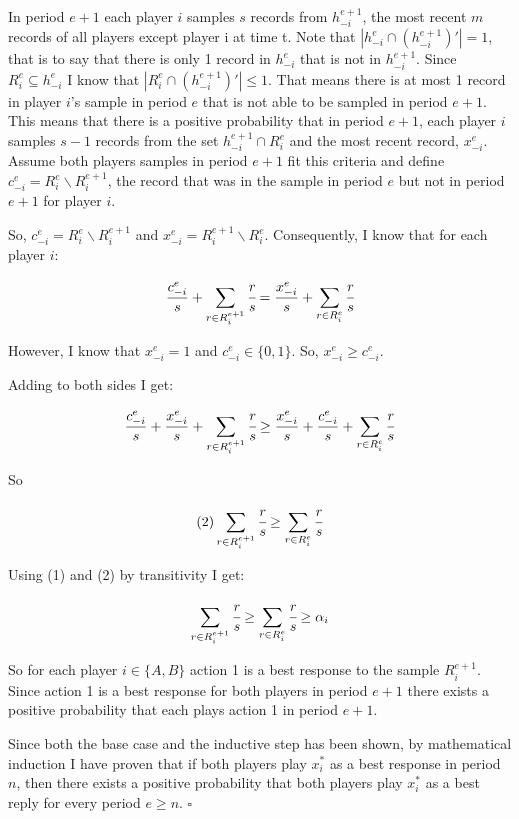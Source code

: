\documentclass[12pt]{article}
\begin{document}
\vskip6pt

In period $e+1$ each player $i$ samples $s$ records from $h_{-i}^{e+1}$, the most recent $m$
records of all players except player i at time t. Note that $|h_{-i}^{e} \cap (h_{-i}^{e+1})'|=1$, that is to say that there is only 1 record in $h_{-i}^{e}$ that is not in $h_{-i}^{e+1}$. Since $R_i^{e} \subseteq h_{-i}^{e}$ I know that $|R_i^{e} \cap (h_{-i}^{e+1})'| \leq 1$. That means there is at most 1 record in player $i$'s sample in period $e$ that is not able to be sampled in period $e+1$. This means that there is a positive probability that in period $e+1$, each player $i$ samples $s-1$ records from the set $h_{-i}^{e+1} \cap R_i^{e}$ and the most recent record, $x_{-i}^{e}$. Assume both players samples in period $e+1$ fit this criteria and define $c_{-i}^{e}=R_i^e \backslash R_i^{e+1}$, the record that was in the sample in period $e$ but not in period $e+1$ for player $i$.

\vskip6pt

So, $c_{-i}^{e}=R_i^e \backslash R_i^{e+1}$ and $x_{-i}^{e}=R_i^{e+1} \backslash R_i^{e}$. Consequently, I know that for each player $i$:

$$\frac{c_{-i}^{e}}{s} + \sum\limits_{r \in R_i^{e+1}} \cfrac{r}{s} = \frac{x_{-i}^{e}}{s} + \sum\limits_{r \in R_i^{e}} \cfrac{r}{s}$$

However, I know that $x_{-i}^{e}=1$ and $c_{-i}^{e} \in \{0,1\}$. So, $x_{-i}^{e} \geq c_{-i}^{e}$.

Adding to both sides I get:

$$\frac{c_{-i}^{e}}{s} + \frac{x_{-i}^{e}}{s} + \sum\limits_{r \in R_i^{e+1}} \cfrac{r}{s} \geq \frac{x_{-i}^{e}}{s} + \frac{c_{-i}^{e}}{s} + \sum\limits_{r \in R_i^{e}} \cfrac{r}{s}$$

So

$$(2) \sum\limits_{r \in R_i^{e+1}} \cfrac{r}{s} \geq \sum\limits_{r \in R_i^{e}} \cfrac{r}{s}$$

Using (1) and (2) by transitivity I get:

$$\sum\limits_{r \in R_i^{e+1}} \cfrac{r}{s} \geq \sum\limits_{r \in R_i^{e}} \cfrac{r}{s} \geq \alpha_i$$

So for each player $i \in \{A,B\}$ action 1 is a best response to the sample $R_i^{e+1}$. Since action 1 is a best response for both players in period $e+1$ there exists a positive probability that each plays action 1 in period $e+1$.

\vskip6pt

Since both the base case and the inductive step has been shown, by mathematical induction I have proven that if both players play $x_i^*$ as a best response in period $n$, then there exists a positive probability that both players play $x_i^*$ as a best reply for every period $e \geq n$. $\square$
\end{document}
